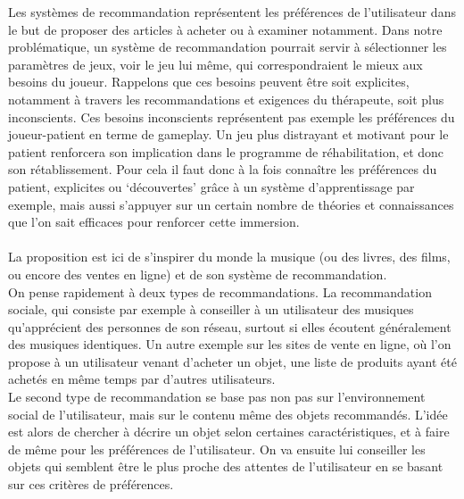 Les systèmes de recommandation représentent les préférences de l'utilisateur dans le but de proposer des articles à acheter ou à examiner notamment. Dans notre problématique, un système de recommandation pourrait servir à sélectionner les paramètres de jeux, voir le jeu lui même, qui correspondraient le mieux aux besoins du joueur. Rappelons que ces besoins peuvent être soit explicites, notamment à travers les recommandations et exigences du thérapeute, soit plus inconscients. Ces besoins inconscients représentent pas exemple les préférences du joueur-patient en terme de gameplay. Un jeu plus distrayant et motivant pour le patient renforcera son implication dans le programme de réhabilitation, et donc son rétablissement. Pour cela il faut donc à la fois connaître les préférences du patient, explicites ou `découvertes'  grâce à un système d'apprentissage par exemple, mais aussi s'appuyer sur un certain nombre de théories et connaissances que l'on sait efficaces pour renforcer cette immersion. 	
	 
 \paragraph{}
 La proposition est ici de s'inspirer du monde la musique (ou des livres, des films, ou encore des ventes en ligne) et de son système de recommandation.\\
 On pense rapidement à deux types de recommandations. La recommandation sociale, qui consiste par exemple à conseiller à un utilisateur des musiques qu'apprécient des personnes de son réseau, surtout si elles écoutent généralement des musiques identiques. Un autre exemple sur les sites de vente en ligne, où l'on propose à un utilisateur venant d'acheter un objet, une liste de produits ayant été achetés en même temps par d'autres utilisateurs. \\
Le second type de recommandation se base pas non pas sur l'environnement social de l'utilisateur, mais sur le contenu même des objets recommandés. L'idée est alors de chercher à décrire un objet selon certaines caractéristiques, et à faire de même pour les préférences de l'utilisateur. On va ensuite lui conseiller les objets qui semblent être le plus proche des attentes de l'utilisateur en se basant sur ces critères de préférences. 
 
